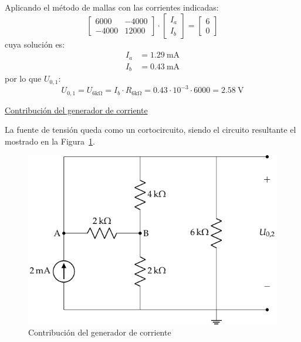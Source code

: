 \begin{example}
    Aplicando el método de mallas con las corrientes indicadas:
    \begin{equation*}
        \begin{bmatrix}
            6000 & -4000\\[4pt]
            -4000 & 12000
        \end{bmatrix}
        \cdot
        \begin{bmatrix}
            I_a\\[4pt]
            I_b
        \end{bmatrix}
        =
        \begin{bmatrix}
            6\\[4pt]
            0
        \end{bmatrix}
    \end{equation*}
    cuya solución es:
    \begin{align*}
        I_a &= \qty{1.29}{\milli\ampere}\\
        I_b &= \qty{0.43}{\milli\ampere}
    \end{align*}
    por lo que $U_{0,1}$:
    \begin{equation*}
        U_{0,1} 
        = U_{6\si{\kilo\ohm}}
        = I_b\cdot R_{6\si{\kilo\ohm}}
        = 0.43\cdot 10^{-3}\cdot 6000
        = \qty{2.58}{\volt}
    \end{equation*}

    \vspace{2mm}
    \underline{Contribución del generador de corriente}

    \vspace{2mm}
    La fuente de tensión queda como un cortocircuito, siendo el circuito resultante el mostrado en la Figura~\ref{fig.ej_superposicion_cc_corriente}. 
    \begin{figure}[H]
        \centering
        \includegraphics[width=0.6\linewidth]{../figs/ej_superposicion_cc_corriente.pdf}
        \caption{Contribución del generador de corriente}
        \label{fig.ej_superposicion_cc_corriente}
    \end{figure}
    

\end{example}
